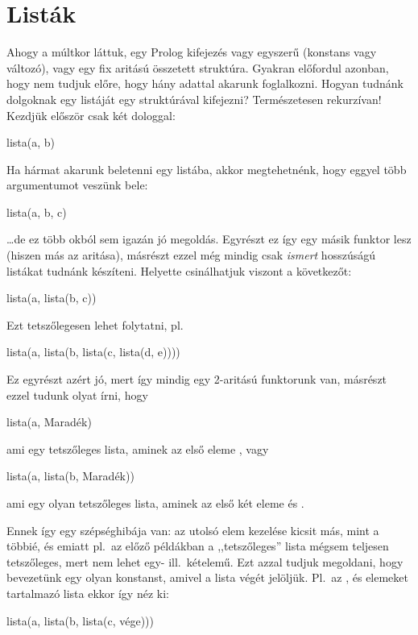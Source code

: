 \chapter{Listák}
Ahogy a múltkor láttuk, egy Prolog kifejezés vagy
egyszerű (konstans vagy változó), vagy egy fix
aritású összetett struktúra. Gyakran előfordul
azonban, hogy nem tudjuk előre, hogy hány adattal
akarunk foglalkozni. Hogyan tudnánk dolgoknak egy
listáját egy struktúrával kifejezni? Természetesen
rekurzívan! Kezdjük először csak két dologgal:
\begin{query}
lista(a, b)
\end{query}
Ha hármat akarunk beletenni egy listába, akkor
megtehetnénk, hogy eggyel több argumentumot veszünk
bele:
\begin{query}
lista(a, b, c)
\end{query}
\dots de ez több okból sem igazán jó
megoldás. Egyrészt ez így egy másik funktor lesz
(hiszen más az aritása), másrészt ezzel még mindig
csak \emph{ismert} hosszúságú listákat tudnánk
készíteni. Helyette csinálhatjuk viszont a
következőt:
\begin{query}
lista(a, lista(b, c))
\end{query}
Ezt tetszőlegesen lehet folytatni, pl.
\begin{query}
lista(a, lista(b, lista(c, lista(d, e))))
\end{query}
Ez egyrészt azért jó, mert így mindig egy 2-aritású
 funktorunk van, másrészt ezzel tudunk
olyat írni, hogy
\begin{query}
lista(a, Maradék)
\end{query}
ami egy tetszőleges lista, aminek az első eleme
, vagy
\begin{query}
lista(a, lista(b, Maradék))
\end{query}
ami egy olyan tetszőleges lista, aminek az első két
eleme  és .

Ennek így egy szépséghibája van: az utolsó elem
kezelése kicsit más, mint a többié, és emiatt pl.~az
előző példákban a ,,tetszőleges'' lista mégsem
teljesen tetszőleges, mert nem lehet egy-
ill.~kételemű. Ezt azzal tudjuk megoldani, hogy
bevezetünk egy olyan konstanst, amivel a lista végét
jelöljük. Pl.~az ,  és  elemeket
tartalmazó lista ekkor így néz ki:
\begin{query}
lista(a, lista(b, lista(c, vége)))
\end{query}

